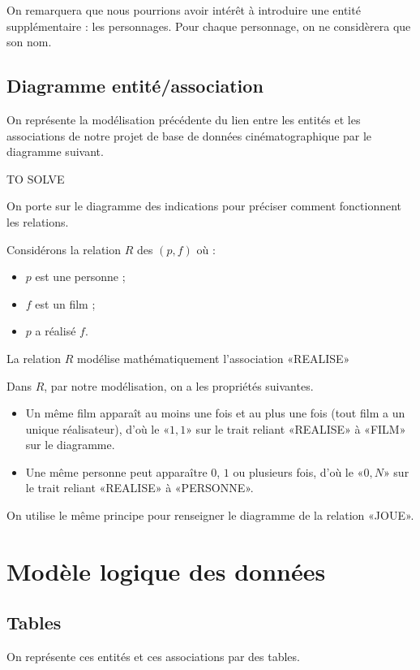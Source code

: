 On remarquera que nous pourrions avoir intérêt à introduire une entité supplémentaire : les personnages. Pour chaque personnage, on ne considèrera que son nom. 

\subsection{Diagramme entité/association}

On représente la modélisation précédente du lien entre les entités et les associations de notre projet de base de données cinématographique par le diagramme suivant.
\begin{center}
TO SOLVE %
\end{center}

On porte sur le diagramme des indications pour préciser comment
fonctionnent les relations.

Considérons la relation $R$ des $(p,f)$ où :
\begin{itemize}
\item $p$ est une personne ;
\item $f$ est un film ;
\item $p$ a réalisé $f$.
\end{itemize}
\begin{rem}
  La relation $R$ modélise mathématiquement l'association «REALISE»
\end{rem}


Dans $R$, par notre modélisation, on a les propriétés suivantes. 
\begin{itemize}
\item Un même film apparaît au moins une fois et au plus une fois
  (tout film a un unique réalisateur), d'où le «$1,1$» sur le trait
  reliant «REALISE» à «FILM» sur le diagramme.
\item Une même personne peut apparaître $0$, $1$ ou plusieurs fois,
  d'où le «$0, N$» sur le trait reliant «REALISE» à «PERSONNE».
\end{itemize}

On utilise le même principe pour renseigner le diagramme de la relation «JOUE».

\section{Modèle logique des données}
\subsection{Tables}
On représente ces entités et ces associations par des tables. 

